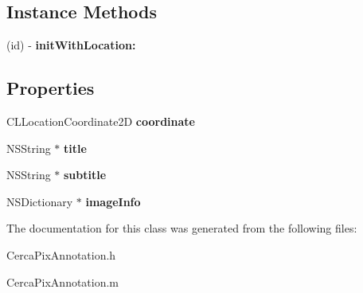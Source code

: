\subsection*{Instance Methods}
\begin{DoxyCompactItemize}
\item 
\hypertarget{interface_cerca_pix_annotation_aa0f93c4619b785ddbe6cbf4472c10f47}{(id) -\/ {\bfseries init\-With\-Location\-:}}\label{interface_cerca_pix_annotation_aa0f93c4619b785ddbe6cbf4472c10f47}

\end{DoxyCompactItemize}
\subsection*{Properties}
\begin{DoxyCompactItemize}
\item 
\hypertarget{interface_cerca_pix_annotation_a91cc855c6c7501a801fa3763f08cbb5b}{C\-L\-Location\-Coordinate2\-D {\bfseries coordinate}}\label{interface_cerca_pix_annotation_a91cc855c6c7501a801fa3763f08cbb5b}

\item 
\hypertarget{interface_cerca_pix_annotation_ac51378f5d5206be04c345ac2be703691}{N\-S\-String $\ast$ {\bfseries title}}\label{interface_cerca_pix_annotation_ac51378f5d5206be04c345ac2be703691}

\item 
\hypertarget{interface_cerca_pix_annotation_a5f8b2942821eb619edb8de87ac2c13da}{N\-S\-String $\ast$ {\bfseries subtitle}}\label{interface_cerca_pix_annotation_a5f8b2942821eb619edb8de87ac2c13da}

\item 
\hypertarget{interface_cerca_pix_annotation_a046d5f0caac552979341c346b4c206c3}{N\-S\-Dictionary $\ast$ {\bfseries image\-Info}}\label{interface_cerca_pix_annotation_a046d5f0caac552979341c346b4c206c3}

\end{DoxyCompactItemize}


The documentation for this class was generated from the following files\-:\begin{DoxyCompactItemize}
\item 
Cerca\-Pix\-Annotation.\-h\item 
Cerca\-Pix\-Annotation.\-m\end{DoxyCompactItemize}
